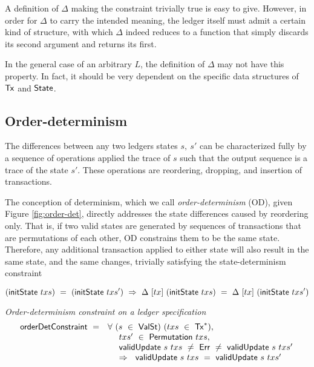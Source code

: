 A definition of $\Delta$ making the constraint trivially true is easy to give.
However, in order for $\Delta$ to carry the intended meaning, the ledger
itself must admit a certain kind of structure, with which $\Delta$ indeed reduces to a
function that simply discards its second argument and returns its first.

In the general case of an arbitrary $L$, the definition of $\Delta$ may not have
this property. In fact, it should be very dependent on the specific data structures
of $\mathsf{Tx}$ and $\mathsf{State}$.

\subsection{Order-determinism}
\label{sec:order-det}

The differences between any two ledgers states $s,~ s'$ can be characterized fully
by a sequence of operations applied the trace of $s$ such that the output
sequence is a trace of the state $s'$. These operations are reordering, dropping,
and insertion of transactions.

The conception of determinism, which we call \emph{order-determinism} (OD), given Figure \ref{fig:order-det},
directly addresses the state differences caused by reordering only. That is,
if two valid states are generated by sequences of transactions that are permutations
of each other, OD constrains them to be the same state. Therefore, any additional transaction
applied to either state will also result in the same state, and the same changes, trivially
satisfying the state-determinism constraint

\[ (\mathsf{initState}~txs)~ =~ (\mathsf{initState}~txs') ~\Rightarrow ~\Delta~[tx]~(\mathsf{initState}~txs)~=~\Delta~[tx]~(\mathsf{initState}~txs') \]

\begin{figure*}[htb]
  \emph{Order-determinism constraint on a ledger specification}
  \begin{equation*}
    \begin{array}{l@{~~}l@{~~}ll}
    \fun{orderDetConstraint} ~=~ & \forall~(s~\in~\type{ValSt})~(txs~\in~\seqof{\type{Tx}}),~\\
    & ~~~~txs'~\in~\fun{Permutation}~txs,~\\
    & ~~~~\fun{validUpdate}~s~txs~\neq~\Err~\neq~\fun{validUpdate}~s~txs' \\
    & ~~~~\Rightarrow~~\fun{validUpdate}~s~txs~=~\fun{validUpdate}~s~txs'
    \end{array}
  \end{equation*}
  \caption{Order-determinism}
  \label{fig:order-det}
\end{figure*}

